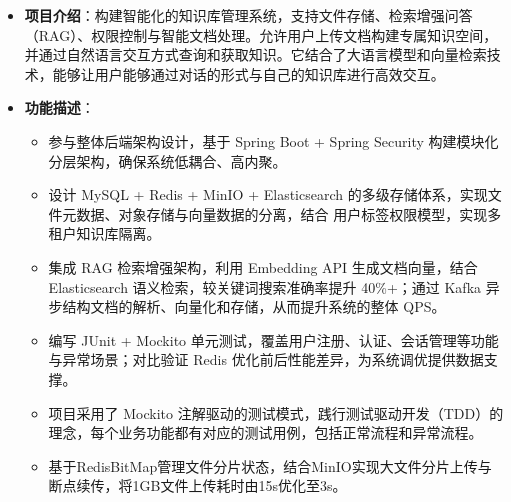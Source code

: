 \documentclass{../../styles/resume}
\begin{document}
\begin{itemize}[leftmargin=*, labelsep=0.5em]
  \item \textbf{项目介绍}：构建智能化的知识库管理系统，支持文件存储、检索增强问答（RAG）、权限控制与智能文档处理。允许用户上传文档构建专属知识空间，并通过自然语言交互方式查询和获取知识。它结合了大语言模型和向量检索技术，能够让用户能够通过对话的形式与自己的知识库进行高效交互。
  \item \textbf{功能描述}：
    \begin{itemize}
      \item 参与整体后端架构设计，基于 Spring Boot + Spring Security 构建模块化分层架构，确保系统低耦合、高内聚。
      \item 设计 MySQL + Redis + MinIO + Elasticsearch 的多级存储体系，实现文件元数据、对象存储与向量数据的分离，结合 用户标签权限模型，实现多租户知识库隔离。
      \item 集成 RAG 检索增强架构，利用 Embedding API 生成文档向量，结合 Elasticsearch 语义检索，较关键词搜索准确率提升 40\%+；通过 Kafka 异步结构文档的解析、向量化和存储，从而提升系统的整体 QPS。
      \item 编写 JUnit + Mockito 单元测试，覆盖用户注册、认证、会话管理等功能与异常场景；对比验证 Redis 优化前后性能差异，为系统调优提供数据支撑。
      \item 项目采用了 Mockito 注解驱动的测试模式，践行测试驱动开发（TDD）的理念，每个业务功能都有对应的测试用例，包括正常流程和异常流程。
      \item 基于RedisBitMap管理文件分片状态，结合MinIO实现大文件分片上传与断点续传，将1GB文件上传耗时由15s优化至3s。
    \end{itemize}
\end{itemize}

\end{document}
